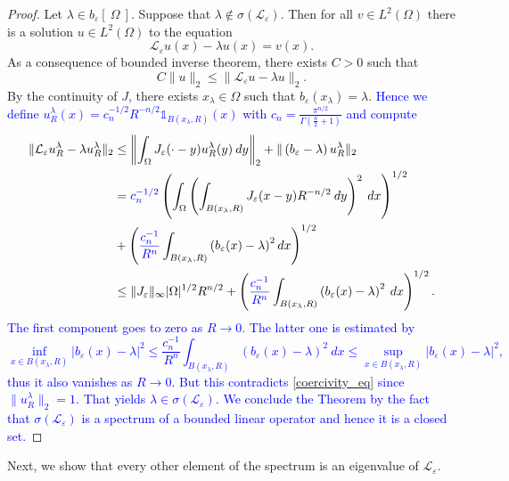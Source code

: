 \documentclass[12pt, a4paper]{article}
\theoremstyle{break}
\theoremstyle{break}
\theoremstyle{break}
\theoremstyle{break}
\theoremstyle{break}
\newcommand{\Leo}{\mathcal{L}_{\varepsilon}}
\newcommand{\Leb}{L^2\left(\Omega\right)}
\begin{document}
\begin{proof}
    Let $\lambda \in b_\varepsilon\left[\:\Omega\:\right]$. Suppose that $\lambda \notin \sigma(\Leo)$. Then for all $v \in \Leb$ there is a solution $u \in \Leb$ to the equation
    $$\Leo u (x) - \lambda u(x) = v(x).$$
    As a consequence of bounded inverse theorem, there exists $C > 0$ such that
    \begin{equation}
        C \|u\|_2 \leq \|\Leo u - \lambda u\|_2 \label{coercivity_eq}.
    \end{equation}
    By the continuity of $J$, there exists $x_\lambda \in \Omega$ such that $b_\varepsilon(x_\lambda) = \lambda$. \textcolor{blue}{Hence we define $u_R^\lambda(x) = c_n^{-1/2}R^{-n/2} \mathds{1}_{B(x_\lambda, R)}(x)$ with $c_n = \frac{\pi^{n/2}}{\Gamma(\frac{n}{2} + 1)}$ and compute}
    \begin{align*}
        \|\Leo u_R^{\lambda} - \lambda u_R^{\lambda}\|_2
        &\leq \left\| \int_{\Omega} J_{\varepsilon}(\cdot-y) u_R^{\lambda}(y)\:dy \right\|_2 + \|\left(b_\varepsilon - \lambda\right) u_R^\lambda\|_2 \\
        &= \textcolor{blue}{c_n^{-1/2}}\left(\int_\Omega\left(\int_{B(x_\lambda, R)} J_\varepsilon(x-y) R^{-n/2} \:dy\right)^2\:dx \right)^{1/2} \\
        &+ \left(\textcolor{blue}{\frac{c_n^{-1}}{R^n}}\int_{B(x_\lambda, R)}\left(b_\varepsilon(x) - \lambda \right)^2dx\right)^{1/2} \\
        &\leq \|J_{\varepsilon}\|_{\infty} |\Omega|^{1/2} R^{n/2} + \left(\textcolor{blue}{\frac{c_n^{-1}}{R^n}}\int_{B(x_\lambda, R)}\left(b_\varepsilon(x) - \lambda \right)^2 \:dx\right)^{1/2}.
    \end{align*}
    \textcolor{blue}{The first component goes to zero as $R \rightarrow 0$. The latter one is estimated by
    \begin{equation*}
        \inf_{x \in B(x_\lambda, R)} |b_\varepsilon(x) - \lambda|^2 \leq \frac{c_n^{-1}}{R^n}\int_{B(x_\lambda, R)}\left(b_\varepsilon(x) - \lambda \right)^2 \:dx \leq \sup_{x \in B(x_\lambda, R)} |b_\varepsilon(x) - \lambda|^2,
    \end{equation*}
    thus it also vanishes as $R \rightarrow 0$. But this contradicts \eqref{coercivity_eq} since $\| u_R^\lambda \|_2 = 1$. That yields $\lambda \in \sigma(\Leo)$. We conclude the Theorem by the fact that $\sigma(\Leo)$ is a spectrum of a bounded linear operator and hence it is a closed set.}
\end{proof}
Next, we show that every other element of the spectrum is an eigenvalue of $\Leo$.
\end{document}
